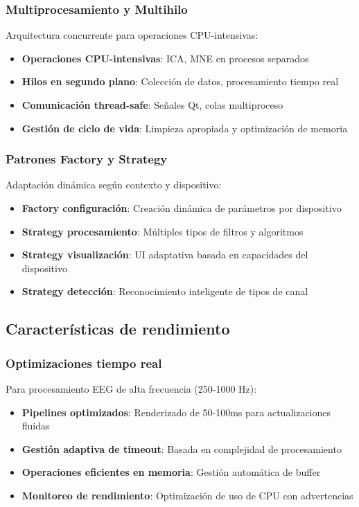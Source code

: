 \subsubsection{Multiprocesamiento y Multihilo}
Arquitectura concurrente para operaciones CPU-intensivas:
\begin{itemize}
    \item \textbf{Operaciones CPU-intensivas}: ICA, MNE en procesos separados
    \item \textbf{Hilos en segundo plano}: Colección de datos, procesamiento tiempo real
    \item \textbf{Comunicación thread-safe}: Señales Qt, colas multiproceso
    \item \textbf{Gestión de ciclo de vida}: Limpieza apropiada y optimización de memoria
\end{itemize}

\subsubsection{Patrones Factory y Strategy}
Adaptación dinámica según contexto y dispositivo:
\begin{itemize}
    \item \textbf{Factory configuración}: Creación dinámica de parámetros por dispositivo
    \item \textbf{Strategy procesamiento}: Múltiples tipos de filtros y algoritmos
    \item \textbf{Strategy visualización}: UI adaptativa basada en capacidades del dispositivo
    \item \textbf{Strategy detección}: Reconocimiento inteligente de tipos de canal
\end{itemize}

\subsection{Características de rendimiento}
\label{subsec:rendimiento_eeg_processor}

\subsubsection{Optimizaciones tiempo real}

Para procesamiento EEG de alta frecuencia (250-1000 Hz):
\begin{itemize}
    \item \textbf{Pipelines optimizados}: Renderizado de 50-100ms para actualizaciones fluidas
    \item \textbf{Gestión adaptiva de timeout}: Basada en complejidad de procesamiento
    \item \textbf{Operaciones eficientes en memoria}: Gestión automática de buffer
    \item \textbf{Monitoreo de rendimiento}: Optimización de uso de CPU con advertencias
\end{itemize}


